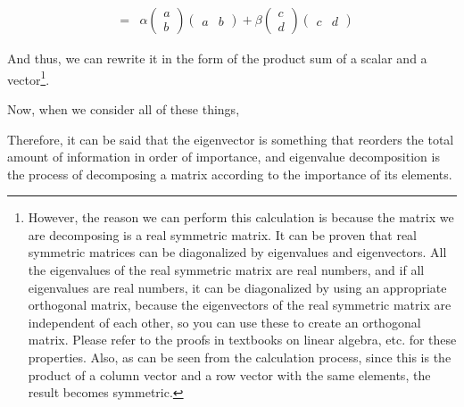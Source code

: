 \documentclass{ltjsbook}
\begin{document}
\[\begin{array}{lll}
		              &                                                                                                                                            \\
		              & = & \alpha \begin{pmatrix}a\\b\end{pmatrix}\begin{pmatrix}a &b\end{pmatrix} +
		\beta \begin{pmatrix} c\\d \end{pmatrix}\begin{pmatrix}c&d\end{pmatrix}
	\end{array}
\]

And thus, we can rewrite it in the form of the product sum of a scalar and a vector\footnote{However, the reason we can perform this calculation is because the matrix we are decomposing is a real symmetric matrix. It can be proven that real symmetric matrices can be diagonalized by eigenvalues ​​and eigenvectors. All the eigenvalues ​​of the real symmetric matrix are real numbers, and if all eigenvalues ​​are real numbers, it can be diagonalized by using an appropriate orthogonal matrix, because the eigenvectors of the real symmetric matrix are independent of each other, so you can use these to create an orthogonal matrix. Please refer to the proofs in textbooks on linear algebra, etc. for these properties. Also, as can be seen from the calculation process, since this is the product of a column vector and a row vector with the same elements, the result becomes symmetric.}.


Now, when we consider all of these things,

Therefore, it can be said that the eigenvector is something that reorders the total amount of information in order of importance, and eigenvalue decomposition is the process of decomposing a matrix according to the importance of its elements.
\end{document}
